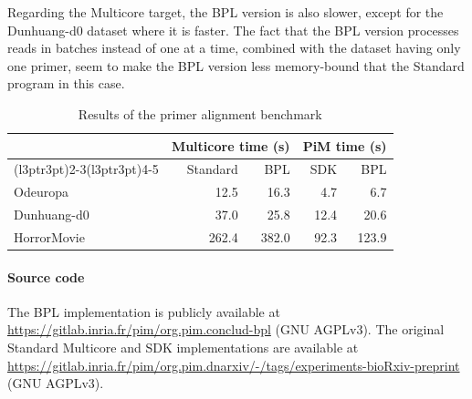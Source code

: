 Regarding the Multicore target, the BPL version is also slower, except for the Dunhuang-d0 dataset where it is faster.
The fact that the BPL version processes reads in batches instead of one at a time, combined with the dataset having only one primer, seem to make the BPL version less memory-bound that the Standard program in this case.

\begin{table}[htbp]
    \centering
    \caption{Results of the primer alignment benchmark}
    \label{tab:sw-results}
    \begin{tabular}{lrrrr}
    \toprule
    & \multicolumn{2}{c}{Multicore time (s)} & \multicolumn{2}{c}{PiM time (s)} \\
    \cmidrule(l{3pt}r{3pt}){2-3}\cmidrule(l{3pt}r{3pt}){4-5}
    & Standard & BPL & SDK & BPL \\
    \midrule
    Odeuropa & 12.5 & 16.3 & 4.7 & 6.7 \\
    Dunhuang-d0 & 37.0 & 25.8 & 12.4 & 20.6 \\
    HorrorMovie & 262.4 & 382.0 & 92.3 & 123.9 \\
    \bottomrule
    \end{tabular}
\end{table}

\paragraph{Source code} The BPL implementation is publicly available at \url{https://gitlab.inria.fr/pim/org.pim.conclud-bpl} (GNU AGPLv3).
The original Standard Multicore and SDK implementations are available at \url{https://gitlab.inria.fr/pim/org.pim.dnarxiv/-/tags/experiments-bioRxiv-preprint} (GNU AGPLv3).
